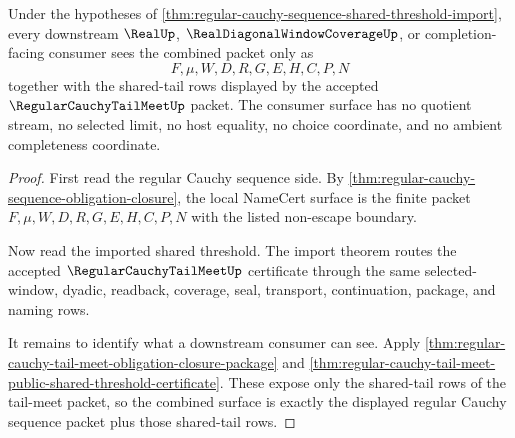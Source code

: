 \begin{theorem}
\label{thm:regular-cauchy-sequence-tail-meet-consumer-surface}
Under the hypotheses of \autoref{thm:regular-cauchy-sequence-shared-threshold-import}, every downstream $\RealUp$, $\RealDiagonalWindowCoverageUp$, or completion-facing consumer sees the combined packet only as
$$
F,\mu,W,D,R,G,E,H,C,P,N
$$
together with the shared-tail rows displayed by the accepted $\RegularCauchyTailMeetUp$ packet. The consumer surface has no quotient stream, no selected limit, no host equality, no choice coordinate, and no ambient completeness coordinate.
\end{theorem}
\begin{proof}
First read the regular Cauchy sequence side. By \autoref{thm:regular-cauchy-sequence-obligation-closure}, the local NameCert surface is the finite packet $F,\mu,W,D,R,G,E,H,C,P,N$ with the listed non-escape boundary.

Now read the imported shared threshold. The import theorem routes the accepted $\RegularCauchyTailMeetUp$ certificate through the same selected-window, dyadic, readback, coverage, seal, transport, continuation, package, and naming rows.

It remains to identify what a downstream consumer can see. Apply \autoref{thm:regular-cauchy-tail-meet-obligation-closure-package} and \autoref{thm:regular-cauchy-tail-meet-public-shared-threshold-certificate}. These expose only the shared-tail rows of the tail-meet packet, so the combined surface is exactly the displayed regular Cauchy sequence packet plus those shared-tail rows.
\end{proof}

